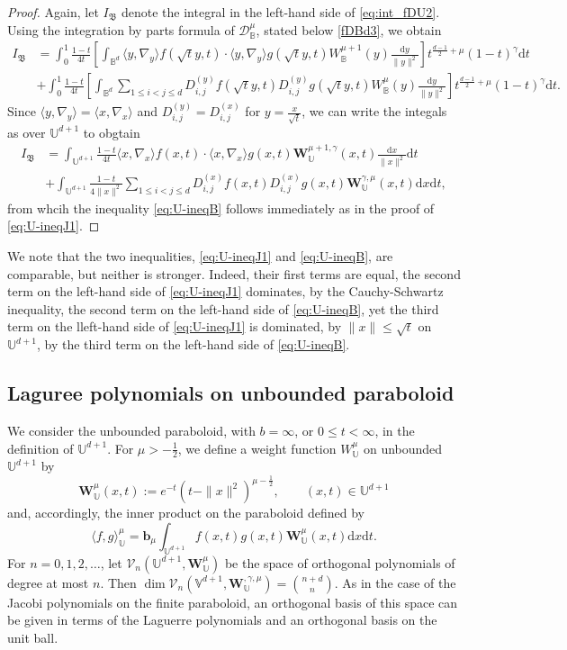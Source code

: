 \documentclass{amsart}
\theoremstyle{remark}
\def\la{{\langle}}
\def\ra{{\rangle}}
\def\d{\mathrm{d}}
\def\fB{{\mathfrak B}}
\def\g{{\gamma}}
\def\la{{\langle}}
\def\ra{{\rangle}}
\def\bb{{\mathbf b}}
\def\Wb{{\mathbf W}}
\def\CD{{\mathcal D}}
\def\CV{{\mathcal V}}
\def\BB{{\mathbb B}}
\def\UU{{\mathbb U}}
\def\VV{{\mathbb V}}
\def\f{\frac}
\begin{document}
\begin{proof}
Again, let $I_{\fB}$ denote the integral in the left-hand side of \eqref{eq:int_fDU2}. Using the integration by parts
formula of $\CD_\BB^\mu$, stated below \eqref{fDBd3}, we obtain
\begin{align*}
 I_{\fB} & =  \int_0^1 \frac{1-t}{4t} \left[ \int_{\BB^d}
   \la y, \nabla_y \ra f \left(\sqrt{t} y, t\right ) \cdot \la y, \nabla_y \ra g\left(\sqrt{t} y, t\right) 
    W_\BB^{\mu+1} (y) \frac{\d y}{\|y\|^2} \right]  t^{\f{d-1}{2} + \mu}(1-t)^\g \d t \\
  & +   \int_0^1 \frac{1-t}{4t} \left[ \int_{\BB^d} \sum_{1\le i< j \le d} D_{i,j}^{(y)} f \left(\sqrt{t} y, t\right )  
    D_{i,j}^{(y)} g\left(\sqrt{t} y, t\right)  W_\BB^{\mu} (y) \frac{ \d y}{\|y\|^2} \right]  t^{\f{d-1}{2} + \mu}(1-t)^\g \d t. 
\end{align*} 
Since $\la y, \nabla_y\ra = \la x, \nabla_x\ra$ and $D_{i,j}^{(y)} =  D_{i,j}^{(x)}$ for $y = \frac{x}{\sqrt{t}}$,
we can write the integals as over $\UU^{d+1}$ to obgtain
\begin{align*}
 I_{\fB} & =  \int_{\UU^{d+1}} \frac{1-t}{4t} \la x, \nabla_x \ra f(x,t) \cdot \la x, \nabla_x \ra g(x, t) 
    \Wb_\UU^{\mu+1,\g} (x,t) \frac{\d x}{\|x\|^2} \d t \\
  & +   \int_{\UU^{d+1}} \frac{1-t}{4\|x\|^2} \sum_{1\le i< j \le d} D_{i,j}^{(x)} f (x,t) D_{i,j}^{(x)} g(x,t) \Wb_\UU^{\g,\mu}(x,t) \d x\d t,
\end{align*} 
from whcih the inequality \eqref{eq:U-ineqB} follows immediately as in the proof of \eqref{eq:U-ineqJ1}. 
\end{proof}

We note that the two inequalities, \eqref{eq:U-ineqJ1} and \eqref{eq:U-ineqB}, are comparable, but neither is 
stronger. Indeed, their first terms are equal,
the second term on the left-hand side of \eqref{eq:U-ineqJ1} dominates, by the Cauchy-Schwartz inequality, 
the second term on the left-hand side of \eqref{eq:U-ineqB}, yet the third term on the lleft-hand side 
of \eqref{eq:U-ineqJ1} is dominated, by $\|x\| \le \sqrt{t}$ on $\UU^{d+1}$, by the third term on the left-hand 
side of \eqref{eq:U-ineqB}.

\subsection{Laguree polynomials on unbounded paraboloid} 
We consider the unbounded paraboloid, with $b=\infty$, or $0 \le t < \infty$, in the definition of $\UU^{d+1}$.  
For $\mu> -\f12$,  we define a weight function $W_\UU^{\mu}$ on unbounded $\UU^{d+1}$ by
$$
    \Wb_\UU^{\mu}(x,t) :=  e^{-t} (t - \|x\|^2)^{\mu-\f12}, \qquad  (x,t) \in \UU^{d+1} 
$$
and, accordingly, the inner product on the paraboloid defined by 
$$
  \la f,g\ra_\UU^{\mu} = \bb_{\mu} \int_{\UU^{d+1}} f(x,t) g(x,t) \Wb_\UU^{\mu}(x,t) \d x\d t. 
$$
For $n=0,1,2,\ldots$, let $\CV_n(\UU^{d+1}, \Wb_\UU^\mu)$ be the space of orthogonal polynomials
of degree at most $n$. Then $\dim \CV_n(\VV^{d+1}, \Wb_\UU^{,\g,\mu}) = \binom{n+d}{n}$. 
As in the case of the Jacobi polynomials on the finite paraboloid, an orthogonal basis of this space 
can be given in terms of the Laguerre polynomials and an orthogonal basis on the unit ball. 
\end{document}
